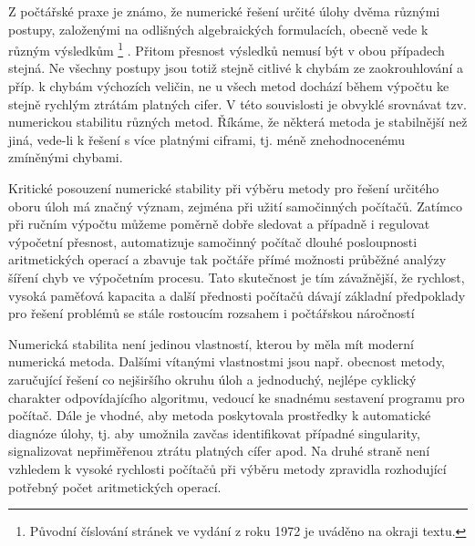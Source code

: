 Z počtářské praxe je známo,
že numerické řešení určité
úlohy dvěma různými postupy, založenými na odlišných algebraických
formulacích, obecně vede k různým
výsledkům%
%
{%
\renewcommand{\thefootnote}{\fnsymbol{footnote}}%
\footnote{Původní číslování stránek
ve vydání z roku 1972 je uváděno na okraji textu.}%
}.
%
Přitom přesnost
výsledků nemusí být v obou případech stejná. Ne všechny postupy
jsou totiž stejně citlivé k chybám ze zaokrouhlování a příp. k
chybám výchozích veličin, ne u všech metod dochází během výpočtu
ke stejně rychlým ztrátám platných cifer. V této souvislosti
je obvyklé srovnávat tzv. numerickou stabilitu různých metod.
Říkáme, že některá metoda je stabilnější než jiná, vede-li k
řešení s více platnými ciframi, tj. méně znehodnocenému zmíněnými
chybami.

Kritické posouzení numerické stability při výběru metody pro
řešení určitého oboru úloh má značný význam, zejména při užití
samočinných počítačů. Zatímco při ručním výpočtu můžeme poměrně
dobře sledovat a případně i regulovat výpočetní přesnost,
automatizuje samočinný počítač dlouhé posloupnosti aritmetických
operací a zbavuje tak počtáře přímé možnosti průběžné analýzy
šíření chyb ve výpočetním procesu. Tato skutečnost je tím
závažnější, že rychlost, vysoká paměťová kapacita a další přednosti
počítačů dávají základní předpoklady pro řešení problémů se
stále rostoucím rozsahem i počtářskou náročností

Numerická stabilita není jedinou vlastností, kterou by měla
mít moderní numerická metoda. Dalšími vítanými vlastnostmi jsou
např. obecnost metody, zaručující řešení co nejširšího okruhu
úloh a jednoduchý, nejlépe cyklický charakter odpovídajícího
algoritmu, vedoucí ke snadnému sestavení programu pro počítač.
Dále je vhodné, aby metoda poskytovala prostředky k automatické
diagnóze úlohy, tj. aby umožnila zavčas identifikovat případné
singularity, signalizovat nepřiměřenou ztrátu platných cífer
apod. Na druhé straně není vzhledem k vysoké rychlosti počítačů
při výběru metody zpravidla rozhodující potřebný počet
aritmetických operací.


